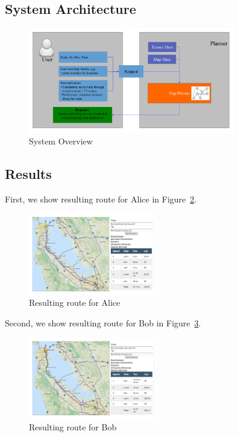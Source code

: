 \documentclass[letterpaper]{article}
\newcommand{\figref}[1]{Figure~\ref{fig:#1}}
\begin{document}
\subsection{System Architecture}
\begin{figure}[!ht]
  \centering
    \includegraphics[width=0.8\textwidth]{figs/system.pdf}
  \caption{System Overview\label{fig:system}}
\end{figure}

\subsection{Results}
First, we show resulting route for Alice in \figref{alice}.
\begin{figure}[!ht]
  \centering
    \includegraphics[width=0.5\textwidth]{figs/result_Alice.pdf}
  \caption{Resulting route for Alice\label{fig:alice}}
\end{figure}

Second, we show resulting route for Bob in \figref{bob}.
\begin{figure}[!ht]
  \centering
    \includegraphics[width=0.5\textwidth]{figs/result_Bob.pdf}
  \caption{Resulting route for Bob\label{fig:bob}}
\end{figure}
\end{document}
